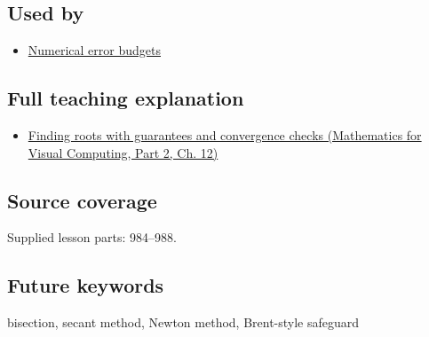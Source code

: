 \subsection{Used by}\label{appendix-f63eb850796d-used-by}

\hypertarget{appendix-f63eb850796d-used-by}{}

\begin{itemize}
\tightlist
\item
  \hyperref[appendix-31b8c295e05f]{Numerical error budgets}
\end{itemize}

\subsection{Full teaching explanation}\label{appendix-f63eb850796d-full-teaching-explanation}

\hypertarget{appendix-f63eb850796d-full-teaching-explanation}{}

\begin{itemize}
\tightlist
\item
  \href{../02-Mathematics-for-Visual-Computing-P02/main.pdf\#02-foundations-ii-ch028-finding-roots-with-guarantees-and-convergence-checks}{Finding roots with guarantees and convergence checks (Mathematics for Visual Computing, Part 2, Ch. 12)}
\end{itemize}

\subsection{Source coverage}\label{appendix-f63eb850796d-source-coverage}

\hypertarget{appendix-f63eb850796d-source-coverage}{}

Supplied lesson parts: 984--988.

\subsection{Future keywords}\label{appendix-f63eb850796d-future-keywords}

\hypertarget{appendix-f63eb850796d-future-keywords}{}

bisection, secant method, Newton method, Brent-style safeguard
